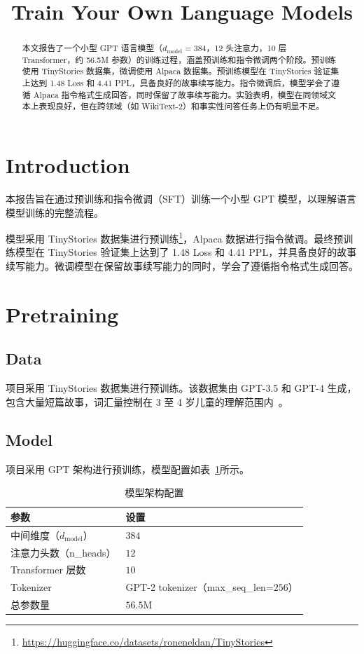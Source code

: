 \documentclass{article}
\title{Train Your Own Language Models}
\author{}
\begin{document}
\maketitle

\begin{abstract}
本文报告了一个小型 GPT 语言模型（$d_{\text{model}}=384$，12 头注意力，10 层 Transformer，约 56.5M 参数）的训练过程，涵盖预训练和指令微调两个阶段。预训练使用 TinyStories 数据集，微调使用 Alpaca 数据集。预训练模型在 TinyStories 验证集上达到 1.48 Loss 和 4.41 PPL，具备良好的故事续写能力。指令微调后，模型学会了遵循 Alpaca 指令格式生成回答，同时保留了故事续写能力。实验表明，模型在同领域文本上表现良好，但在跨领域（如 WikiText-2）和事实性问答任务上仍有明显不足。
\end{abstract}

\section{Introduction}

本报告旨在通过预训练和指令微调（SFT）训练一个小型 GPT 模型，以理解语言模型训练的完整流程。

模型采用 TinyStories 数据集进行预训练\footnote{\url{https://huggingface.co/datasets/roneneldan/TinyStories}}，Alpaca 数据进行指令微调。最终预训练模型在 TinyStories 验证集上达到了 1.48 Loss 和 4.41 PPL，并具备良好的故事续写能力。微调模型在保留故事续写能力的同时，学会了遵循指令格式生成回答。

\section{Pretraining}

\subsection{Data}

项目采用 TinyStories 数据集进行预训练。该数据集由 GPT-3.5 和 GPT-4 生成，包含大量短篇故事，词汇量控制在 3 至 4 岁儿童的理解范围内~\cite{eldan2023tinystories}。

\subsection{Model}

项目采用 GPT 架构进行预训练，模型配置如表~\ref{tab:model_config}所示。

\begin{table}[htbp]
  \centering
  \caption{模型架构配置}
  \label{tab:model_config}
  \begin{tabular}{ll}
    \toprule
    参数 & 设置 \\
    \midrule
    中间维度（$d_{\text{model}}$） & $384$ \\
    注意力头数（n\_heads） & $12$ \\
    Transformer 层数 & $10$ \\
    Tokenizer & GPT-2 tokenizer（max\_seq\_len=$256$） \\
    总参数量 & $56.5\text{M}$ \\
    \bottomrule
  \end{tabular}
\end{table}
\end{document}
